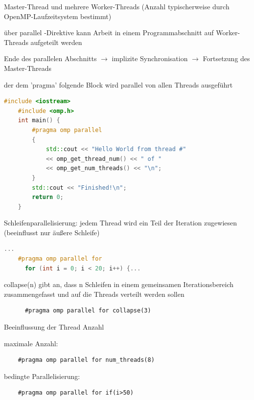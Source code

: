 \documentclass[10pt]{article}
\begin{document}
  
  \begin{itemize*}
    \item Master-Thread und mehrere Worker-Threads (Anzahl typischerweise durch OpenMP-Laufzeitsystem bestimmt)
    \item über parallel -Direktive kann Arbeit in einem Programmabschnitt auf Worker-Threads aufgeteilt werden
    \item Ende des parallelen Abschnitts $\rightarrow$ implizite Synchronisation $\rightarrow$ Fortsetzung des Master-Threads
    \item der dem 'pragma' folgende Block wird parallel von allen Threads ausgeführt
    \begin{lstlisting}[language=C++]
    #include <iostream>
    #include <omp.h>
    int main() {
        #pragma omp parallel
        {
            std::cout << "Hello World from thread #"
            << omp_get_thread_num() << " of "
            << omp_get_num_threads() << "\n";
        }
        std::cout << "Finished!\n";
        return 0;
    }
    \end{lstlisting}
    \item Schleifenparallelisierung: jedem Thread wird ein Teil der Iteration zugewiesen (beeinflusst nur äußere Schleife)
    \begin{lstlisting}[language=C++]
    ...
    #pragma omp parallel for
      for (int i = 0; i < 20; i++) {...
    \end{lstlisting}
    \begin{itemize*}
      \item collapse(n) gibt an, dass n Schleifen in einem gemeinsamen Iterationsbereich zusammengefasst und auf die Threads verteilt werden sollen
      \begin{lstlisting}
      #pragma omp parallel for collapse(3)
      \end{lstlisting}
    \end{itemize*}
    \item Beeinflussung der Thread Anzahl
    \begin{itemize*}
      \item maximale Anzahl:
    \begin{lstlisting}
    #pragma omp parallel for num_threads(8)
    \end{lstlisting}
      \item bedingte Parallelisierung:
    \begin{lstlisting}
    #pragma omp parallel for if(i>50)
    \end{lstlisting}
    \end{itemize*}

\end{itemize*}
\end{document}
